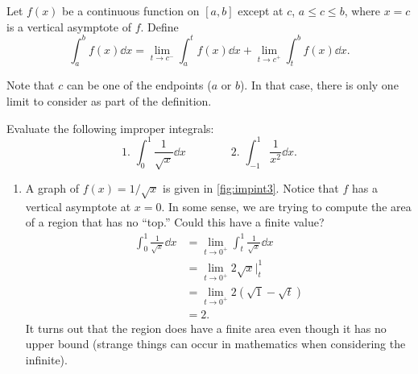 \begin{definition}\label{def:imp_int2}%
Let $f(x)$ be a continuous function on $[a,b]$ except at $c$, $a\leq c\leq b$, where $x=c$ is a vertical asymptote of $f$. Define
\[\int_a^b f(x)\dd x = \lim_{t\to c^-}\int_a^t f(x)\dd x + \lim_{t\to c^+}\int_t^b f(x)\dd x.\]
\end{definition}

Note that $c$ can be one of the endpoints ($a$ or $b$). In that case, there is only one limit to consider as part of the definition.

\begin{example}\label{ex_impint3}%
Evaluate the following improper integrals:
\[
 \text{1. }\int_0^1\frac1{\sqrt{x}}\dd x\qquad\qquad
 \text{2. }\int_{-1}^1\frac{1}{x^2}\dd x.
\]
\solution
\begin{enumerate}
\item		A graph of $f(x) = 1/\sqrt{x}$ is given in \autoref{fig:impint3}.
%
%
Notice that $f$ has a vertical asymptote at $x=0$. In some sense, we are trying to compute the area of a region that has no ``top.'' Could this have a finite value? 
\begin{align*}
	\int_0^1 \frac{1}{\sqrt{x}}\dd x
	&= \lim_{t\to0^+}\int_t^1 \frac1{\sqrt{x}}\dd x \\
	&= \lim_{t\to0^+} 2\sqrt{x}\Big|_t^1 \\
	&= \lim_{t\to0^+} 2\left(\sqrt{1}-\sqrt{t}\right)\\
	&=	2.
\end{align*}
It turns out that the region does have a finite area even though it has no upper bound (strange things can occur in mathematics when considering the infinite).


\end{enumerate}
\end{example}
